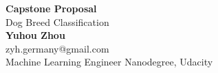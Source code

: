 \documentclass{article}
\begin{document}
	\begin{center}
    
    
		\LARGE{\textbf{Capstone Proposal}} \\
        \vspace{1em}
        \Large{Dog Breed Classification} \\
        \vspace{1em}
        \normalsize\textbf{Yuhou Zhou} \\
        \normalsize{zyh.germany@gmail.com} \\
        \vspace{1em}
        \vspace{1em}
        \normalsize{Machine Learning Engineer Nanodegree, Udacity}
     
	\end{center}
\end{document}
